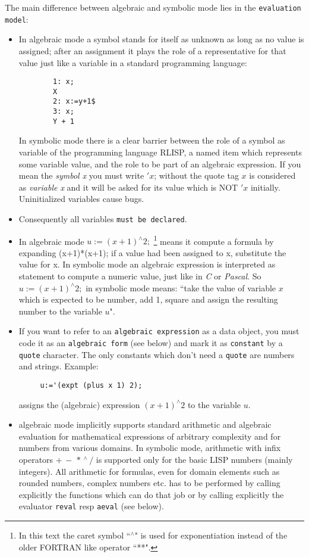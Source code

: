 The main difference between algebraic and symbolic
mode lies in the {\tt evaluation model}:
\begin{itemize}
\item In algebraic mode a symbol stands for itself
as unknown as long as no value is assigned; after
an assignment it plays the role of a representative
for that value just like a variable in a standard
programming language:
\begin{verbatim}
        1: x;
        X
        2: x:=y+1$
        3: x;
        Y + 1
\end{verbatim}
 
In symbolic mode there 
is a clear barrier between the role of a symbol as
variable of the programming language RLISP,
a named item which represents some variable value,
and the role to be part of an algebraic expression. If you mean
the {\em symbol x} you must write $'x$; without
the quote tag $x$ is considered as {\em variable x}
and it will be asked for its value which is NOT $'x$
initially. Uninitialized variables cause bugs.
\item Consequently all variables {\tt must be
declared}.

\item  In algebraic mode $u:=(x+1)^\wedge 2;$
\footnote{In this text the caret symbol ``$^\wedge$" is
used for exponentiation instead of the older
FORTRAN like operator ``**".}
means  {it compute a formula by expanding (x+1)*(x+1);
if a value had been assigned to x, substitute the value for x}.
In symbolic mode an algebraic expression is interpreted 
as statement to compute a numeric value, just like in {\em C}
or {\em Pascal}.
So $u:=(x+1) ^\wedge 2;$ in symbolic mode means: ``take the
value of variable $x$ which is expected to be number,
add 1, square and assign the resulting number to
the variable $u$". 

\item If you want to refer to an
{\tt algebraic expression} as a data object, you
must code it as an {\tt algebraic form}
(see below)
and mark it as {\tt constant} 
by a {\tt quote}
character. The only constants which don't need a
{\tt quote} are numbers and strings.
Example:
\begin{verbatim}
     u:='(expt (plus x 1) 2);
\end{verbatim}
assigns the (algebraic) expression $(x+1)^\wedge 2$ to the variable $u$.

\item algebraic mode implicitly supports standard arithmetic
and algebraic evaluation
for mathematical expressions of arbitrary complexity and
for numbers from various domains. In symbolic mode,
arithmetic with infix operators $+\,-\,*\, ^\wedge \,/$
is supported only for the basic LISP numbers
(mainly integers). All arithmetic for formulas, even
for domain elements such as rounded numbers, complex
numbers etc. has to be performed by calling explicitly
the functions which can do that job or by calling
explicitly the {\reduce} evaluator {\tt reval}
resp  {\tt aeval} (see below). 
\end{itemize}

